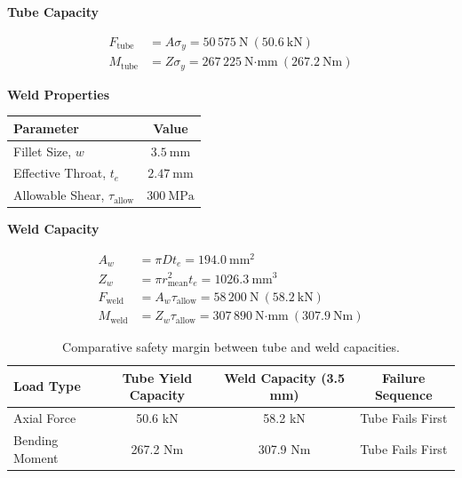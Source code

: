 \noindent\textbf{Tube Capacity}\par
\vspace{4pt}
\begin{align*}
F_{\text{tube}} &= A \sigma_y
= 50\,575\ \text{N} \ (50.6\ \text{kN}) \\
M_{\text{tube}} &= Z \sigma_y
= 267\,225\ \text{N·mm} \ (267.2\ \text{Nm})
\end{align*}

\noindent\textbf{Weld Properties}\par
\vspace{4pt}
\begin{table}[h]
    \centering
    \begin{tabular}{|l|c|}
        \hline
        Parameter & Value \\
        \hline
        Fillet Size, $w$ & $3.5\ \text{mm}$ \\
        Effective Throat, $t_e$ & $2.47\ \text{mm}$ \\
        Allowable Shear, $\tau_{\text{allow}}$ & $300\ \text{MPa}$ \\
        \hline
    \end{tabular}
\end{table}
\vspace{6pt}

\noindent\textbf{Weld Capacity}\par
\vspace{4pt}
\begin{align*}
A_w &= \pi D t_e
= 194.0\ \text{mm}^2 \\
Z_w &= \pi r_{\text{mean}}^2 t_e
= 1026.3\ \text{mm}^3 \\
F_{\text{weld}} &= A_w \tau_{\text{allow}}
= 58\,200\ \text{N} \ (58.2\ \text{kN}) \\
M_{\text{weld}} &= Z_w \tau_{\text{allow}}
= 307\,890\ \text{N·mm} \ (307.9\ \text{Nm})
\end{align*}

\vspace{6pt}

\begin{table}[H]
    \centering
    \caption{Comparative safety margin between tube and weld capacities.}
    \label{tab:weld_vs_tube}
        \footnotesize
        \singlespacing
        \begin{tabular}{|l|c|c|c|}
        \hline
        \textbf{Load Type} & \textbf{Tube Yield Capacity} & \textbf{Weld Capacity (3.5 mm)} & \textbf{Failure Sequence} \\
        \hline
        Axial Force & 50.6 kN & 58.2 kN & Tube Fails First \\
        Bending Moment & 267.2 Nm & 307.9 Nm & Tube Fails First \\
        \hline
    \end{tabular}
\end{table}

